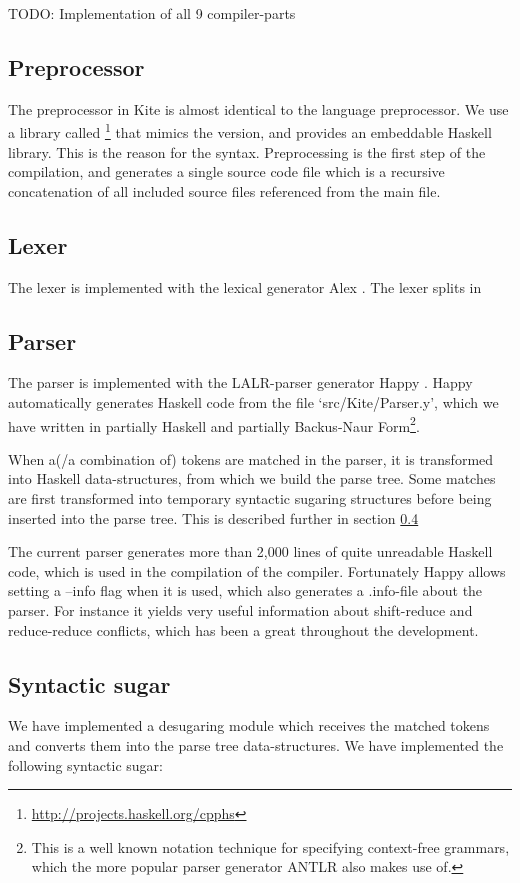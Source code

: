 TODO: Implementation of all 9 compiler-parts


\subsection{Preprocessor}

The preprocessor in Kite is almost identical to the  language preprocessor. We use a library called \footnote{\url{http://projects.haskell.org/cpphs}} that mimics the  version, and provides an embeddable Haskell library. This is the reason for the  syntax. Preprocessing is the first step of the compilation, and generates a single source code file which is a recursive concatenation of all included source files referenced from the main file.

\subsection{Lexer}
The lexer is implemented with the lexical generator Alex \cite{dornan01}. The lexer splits in

\subsection{Parser}
The parser is implemented with the LALR-parser generator Happy \cite{marlow01}. Happy automatically generates Haskell code from the file `src/Kite/Parser.y', which we have written in partially Haskell and partially Backus-Naur Form\footnote{This is a well known notation technique for specifying context-free grammars, which the more popular parser generator ANTLR also makes use of.}.

When a(/a combination of) tokens are matched in the parser, it is transformed into Haskell data-structures, from which we build the parse tree. Some matches are first transformed into temporary syntactic sugaring structures before being inserted into the parse tree. This is described further in section \ref{sec:imp-sugar}

The current parser generates more than 2,000 lines of quite unreadable Haskell code, which is used in the compilation of the compiler. Fortunately Happy allows setting a --info flag when it is used, which also generates a .info-file about the parser. For instance it yields very useful information about shift-reduce and reduce-reduce conflicts, which has been a great throughout the development.


\subsection{Syntactic sugar}
\label{sec:imp-sugar}
We have implemented a desugaring module which receives the matched tokens and converts them into the parse tree data-structures. We have implemented the following syntactic sugar:

